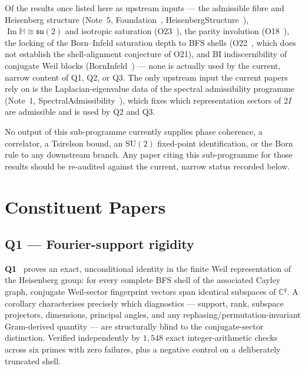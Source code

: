 \documentclass[11pt,a4paper]{article}
\theoremstyle{definition}
\newcommand{\SU}{\mathrm{SU}}
\newcommand{\ImH}{\operatorname{Im}\mathbb{H}}
\newcommand{\su}{\mathfrak{su}}
\newcommand{\twoI}{2I}
\begin{document}
    Of the results once listed here as upstream inputs --- the admissible fibre and Heisenberg
    structure (Note~5, Foundation~\cite{Beau2026m}, HeisenbergStructure~\cite{Beau2026HeisenbergStructure}),
    $\ImH \cong \su(2)$ and isotropic saturation (O23~\cite{Beau2026a27}), the parity involution
    (O18~\cite{Beau2026a22}), the locking of the Born--Infeld saturation depth to BFS shells (O22~\cite{Beau2026a26}, which does not establish the shell-alignment conjecture of O21), and BI
    indiscernibility of conjugate Weil blocks (BornInfeld~\cite{Beau2026c}) --- none is actually
    used by the current, narrow content of Q1, Q2, or Q3. The only upstream input the current
    papers rely on is the Laplacian-eigenvalue data of the spectral admissibility programme
    (Note~1, SpectralAdmissibility~\cite{Beau2026a1}), which fixes which representation sectors of
    $\twoI$ are admissible and is used by Q2 and Q3.

    \noindent No output of this sub-programme currently supplies phase coherence, a correlator,
    a Tsirelson bound, an $\SU(2)$ fixed-point identification, or the Born rule to any downstream
    branch. Any paper citing this sub-programme for those results should be re-audited against
    the current, narrow status recorded below.

  \section{Constituent Papers}
    \label{sec:papers}

    \subsection{Q1 --- Fourier-support rigidity}
      \label{sec:q1}

      \textbf{Q1}~\cite{Beau2026q1} proves an exact, unconditional identity in the finite Weil
      representation of the Heisenberg group: for every complete BFS shell of the associated
      Cayley graph, conjugate Weil-sector fingerprint vectors span identical subspaces of
      $\mathbb{C}^q$. A corollary characterises precisely which diagnostics --- support, rank,
      subspace projectors, dimensions, principal angles, and any rephasing/permutation-invariant
      Gram-derived quantity --- are structurally blind to the conjugate-sector distinction.
      Verified independently by $1{,}548$ exact integer-arithmetic checks across six primes with
      zero failures, plus a negative control on a deliberately truncated shell.
\end{document}
